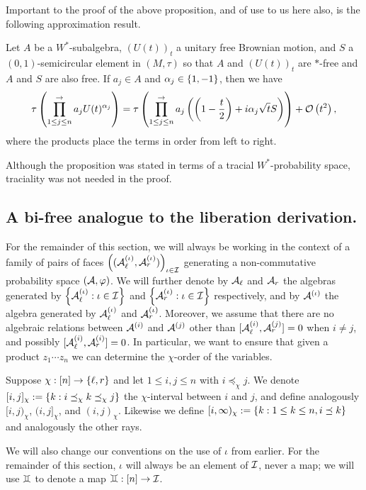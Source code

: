 Important to the proof of the above proposition, and of use to us here also, is the following approximation result.
\begin{proposition}
	\label{prop:approxubm}
	Let $A$ be a $W^*$-subalgebra, $(U(t))_t$ a unitary free Brownian motion, and $S$ a $(0,1)$-semicircular element in $(M, \tau)$ so that $A$ and $(U(t))_t$ are $*$-free and $A$ and $S$ are also free. If $a_j \in A$ and $\alpha_j \in \left\{1,-1\right\}$, then we have
	$$\tau\left(\prod_{1\leq j \leq n}^{\rightarrow} a_j U(t)^{\alpha_j}\right)
	= \tau\left(\prod_{1\leq j \leq n}^{\rightarrow} a_j\left(\left(1-\frac{t}{2}\right)+i\alpha_j\sqrt{t}S\right)\right) + \mathcal{O}\left(t^2\right),$$
	where the products place the terms in order from left to right.
\end{proposition}
Although the proposition was stated in terms of a tracial $W^*$-probability space, traciality was not needed in the proof.

\subsection{A bi-free analogue to the liberation derivation.}
\renewcommand{\e}{\epsilon} %
For the remainder of this section, we will always be working in the context of a family of pairs of faces $\left((\mathcal{A}_\ell^{(\iota)}, \mathcal{A}_r^{(\iota)})\right)_{\iota\in\mathcal{I}}$ generating a non-commutative probability space $(\mathcal{A}, \varphi)$.
We will further denote by $\mathcal{A}_\ell$ and $\mathcal{A}_r$ the algebras generated by $\left\{\mathcal{A}_\ell^{(\iota)} : \iota \in \mathcal{I}\right\}$ and $\left\{\mathcal{A}_r^{(\iota)} : \iota \in \mathcal{I}\right\}$ respectively, and by $\mathcal{A}^{(\iota)}$ the algebra generated by $\mathcal{A}_\ell^{(\iota)}$ and $\mathcal{A}_r^{(\iota)}$.
Moreover, we assume that there are no algebraic relations between $\mathcal{A}^{(i)}$ and $\mathcal{A}^{(j)}$ other than $[\mathcal{A}^{(i)}_\ell, \mathcal{A}^{(j)}_r] = 0$ when $i \neq j$, and possibly $[\mathcal{A}^{(i)}_\ell, \mathcal{A}^{(i)}_r] = 0$.
In particular, we want to ensure that given a product $z_1\cdots z_n$ we can determine the $\chi$-order of the variables.

Suppose $\chi : [n] \to \left\{\ell, r\right\}$ and let $1 \leq i, j \leq n$ with $i \preceq_\chi j$.
We denote $[i, j]_\chi := \left\{k : i \preceq_\chi k \preceq_\chi j\right\}$ the $\chi$-interval between $i$ and $j$, and define analogously $[i, j)_\chi$, $(i, j]_\chi$, and $(i, j)_\chi$.
Likewise we define $[i, \infty)_\chi := \left\{k : 1 \leq k \leq n, i \preceq k\right\}$ and analogously the other rays.

We will also change our conventions on the use of $\iota$ from earlier.
For the remainder of this section, $\iota$ will always be an element of $\mathcal{I}$, never a map; we will use $\gem$ to denote a map $\gem: [n] \to \I$.

